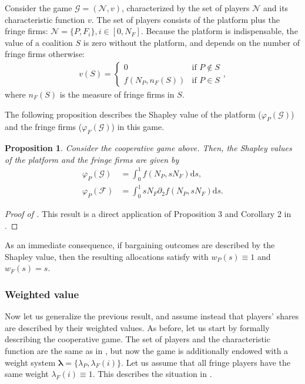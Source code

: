 \documentclass[a4paper]{article}
\newtheorem{proposition}{Proposition}
\newcommand{\ds}{\mathrm{d}s}
\begin{document}
Consider the game $\mathcal{G} = (\mathcal{N}, v)$, characterized by the set of players $\mathcal{N}$ and its characteristic function $v$.
The set of players consists of the platform plus the fringe firms: $\mathcal{N} = \{P, F_i\}, i \in [0, N_F]$.
Because the platform is indispensable, the value of a coalition $S$ is zero without the platform, and depends on the number of fringe firms otherwise:
\begin{align*}
    v(S) = \begin{cases}
        0 & \text{if } P \notin S \\
        f(N_P, n_F(S)) & \text{if } P \in S
    \end{cases},
\end{align*}
where $n_F(S)$ is the measure of fringe firms in $S$.

The following proposition describes the Shapley value of the platform ($\varphi_P(\mathcal{G})$) and the fringe firms ($\varphi_F(\mathcal{G})$) in this game.

\begin{proposition}
    \label{prop:profit_sharing_one_sided}
    Consider the cooperative game above.
    Then, the Shapley values of the platform and the fringe firms are given by
    \begin{align*}
        \varphi_P(\mathcal{G}) &= \int_0^1 f(N_P, s N_F) \ds, \\
        \varphi_P(\mathcal{F}) &= \int_0^1 s N_F \partial_2 f(N_P, s N_F) \ds.
    \end{align*}
\end{proposition}
\begin{proof}[Proof of ]
    This result is a direct application of Proposition 3 and Corollary 2 in \textcite{stancsics2023value}.
\end{proof}

As an immediate consequence, if bargaining outcomes are described by the Shapley value, then the resulting allocations satisfy  with $w_P(s) \equiv 1$ and $w_F(s) = s$.


\subsubsection{Weighted value}
\label{sec:cooperative_game_weighted}

Now let us generalize the previous result, and assume instead that players' shares are described by their weighted values.
As before, let us start by formally describing the cooperative game.
The set of players and the characteristic function are the same as in , but now the game is additionally endowed with a weight system $\mathbf{\lambda} = \{\lambda_P, \lambda_{F}(i)\}$.
Let us assume that all fringe players have the same weight $\lambda_{F}(i) \equiv 1$.
This describes the situation in .
\end{document}

